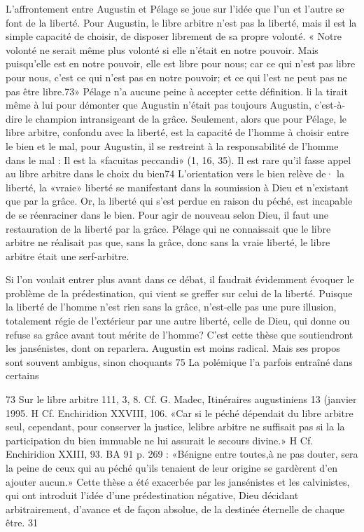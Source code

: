 L'affrontement entre Augustin et Pélage se joue sur l'idée que l'un et l'autre se font  de la liberté. Pour Augustin, le libre arbitre n'est pas la liberté, mais il est  la simple capacité de choisir,  de disposer librement de sa propre volonté.
« Notre volonté ne serait même plus volonté si elle n'était en notre pouvoir. Mais puisqu'elle est en notre pouvoir, elle est libre pour nous; car ce qui n'est pas libre pour nous, c'est ce qui n'est pas en notre pouvoir; et ce qui l'est ne peut pas ne pas être libre.73» Pélage n'a aucune peine à accepter cette définition. li la tirait même à lui pour démonter que Augustin n'était pas toujours Augustin, c'est-à-dire le champion intransigeant de la grâce. Seulement, alors que pour Pélage, le libre arbitre, confondu avec la liberté, est la capacité de l'homme à choisir entre le bien et le mal, pour Augustin, il se restreint  à la responsabilité de l'homme dans le mal : Il est la
«facuitas peccandi» (1, 16, 35).  Il est rare qu'il fasse appel au libre arbitre dans le choix du bien74   L'orientation vers le bien relève de· la liberté, la  «vraie»  liberté se manifestant dans la soumission à Dieu et n'existant que par la grâce. Or, la liberté qui s'est perdue en raison du péché, est incapable de se réenraciner dans le bien. Pour agir de nouveau selon Dieu, il faut une restauration de la liberté par la grâce. Pélage qui ne connaissait que le libre arbitre ne réalisait pas que, sans la grâce, donc sans la vraie liberté,  le libre arbitre était une serf-arbitre.

Si l'on voulait entrer plus avant dans ce débat, il faudrait évidemment évoquer le problème  de  la  prédestination, qui vient se greffer sur celui de la liberté. Puisque la liberté de l'homme n'est rien sans la grâce, n'est-elle pas une pure illusion, totalement régie de l'extérieur par une autre liberté, celle de Dieu, qui donne ou refuse sa grâce avant tout mérite de l'homme? C'est cette thèse que soutiendront les jansénistes, dont on reparlera. Augustin est moins radical. Mais ses propos sont souvent ambigus, sinon choquants 75   La polémique l'a parfois entraîné dans certains

73 Sur le libre arbitre 111, 3, 8. Cf. G. Madec, Itinéraires augustiniens 13 (janvier 1995.
H Cf. Enchiridion XXVIII, 106. «Car si le péché dépendait du libre arbitre seul, cependant, pour conserver la justice, lelibre arbitre ne suffisait pas si la la participation du bien immuable ne lui assurait le secours divine.»
H Cf. Enchiridion XXIII, 93. BA 91 p. 269 : «Bénigne entre toutes,à ne pas douter, sera la peine de ceux qui au péché qu'ils tenaient de leur origine se gardèrent d'en ajouter aucun.» Cette thèse a été exacerbée par les jansénistes et les calvinistes, qui ont introduit l'idée d'une prédestination négative, Dieu décidant arbitrairement, d'avance et de façon absolue, de
la destinée éternelle de chaque être.
31
 
